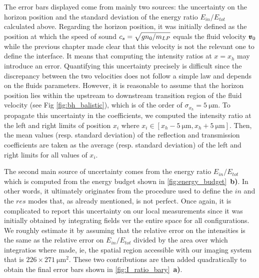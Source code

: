 The error bars displayed come from mainly two sources: the uncertainty on the horizon position and the standard deviation of the energy ratio $E_{in}/E_{tot}$ calculated above.
Regarding the horizon position, it was initially defined as the position at which the speed of sound $c_s=\sqrt{gn_0/m_{LP}}$ equals the fluid velocity $\pmb{v}_0$ while the previous chapter made clear
that this velocity is not the relevant one to define the interface. It means that computing the intensity ratios at $x=x_h$ may introduce an error. Quantifying this uncertainty precisely is difficult since the discrepancy between the two velocities does not follow a simple law and depends on the fluids parameters. However, it is reasonable to assume that the horizon position lies within the upstream to downstream transition region of the fluid velocity (see Fig \ref{fig:bh_balistic}), which is of the order of $\sigma_{x_h}=\SI{5}{\micro \meter}$.
To propagate this uncertainty in the coefficients, we computed the intensity ratio at the left and right limits of position $x_i$ where $x_i \in [x_h-\SI{5}{\micro \meter}, x_h+\SI{5}{\micro \meter}]$. Then,
the mean values (resp. standard deviation) of the reflection and transmission coefficients are taken as the average (resp. standard deviation) of the left and right limits for all values of $x_i$. 

The second main source of uncertainty comes from the energy ratio $E_{in}/E_{tot}$ which is computed from the energy budget shown in \autoref{fig:energy_budget}~\textbf{b)}.
In other words, it ultimately originates from the procedure used to define the $in$ and the $res$ modes that, as already mentioned, is not perfect.
Once again, it is complicated to report this uncertainty on our local measurements since it was initially obtained by integrating fields ver the entire space for all configurations.
We roughly estimate it by assuming that the relative error on the intensities is the same as the relative error on $E_{in}/E_{tot}$ divided by the area over which integratios where made, ie, the spatial region accessible with our imaging system that is $226\times\SI{271}{ \micro \meter \squared}$.
These two contributions are then added quadratically to obtain the final error bars shown in \autoref{fig:I_ratio_bary}~\textbf{a)}.


